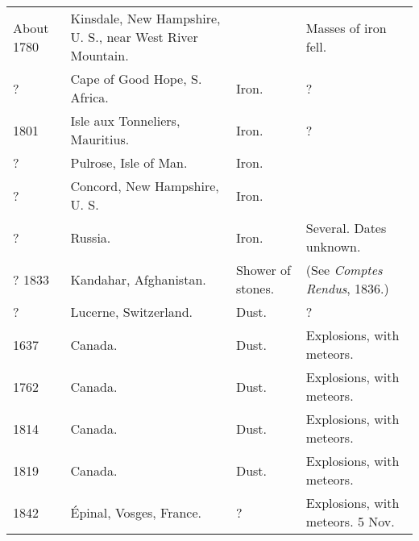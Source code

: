 \documentclass[a4paper, 12pt, oneside]{article}
\begin{document}
\begin{center}
\begin{longtable}{|p{12mm}|p{45mm}|p{12mm}|p{35mm}|}
        About 1780 & Kinsdale, New Hampshire, U. S., near West River Mountain. & ~ & Masses of iron fell. \\
        ? & Cape of Good Hope, S. Africa. & Iron. & ? \\
        1801 & Isle aux Tonneliers, Mauritius. & Iron. & ? \\
        ? & Pulrose, Isle of Man. & Iron. & ~ \\
        ? & Concord, New Hampshire, U. S. & Iron. & ~ \\
        ? & Russia. & Iron. & Several. Dates unknown. \\
        ? 1833 & Kandahar, Afghanistan. & Shower of stones. & (See \emph{Comptes Rendus}, 1836.) \\
        ? & Lucerne, Switzerland. & Dust. & ? \\
        1637 & Canada. & Dust. & Explosions, with meteors. \\
        1762 & Canada. & Dust. & Explosions, with meteors. \\
        1814 & Canada. & Dust. & Explosions, with meteors. \\
        1819 & Canada. & Dust. & Explosions, with meteors. \\
        1842 & Épinal, Vosges, France. & ? & Explosions, with meteors. 5 Nov. \\ \hline
    \end{longtable}
\end{center}
\clearpage
\end{document}
